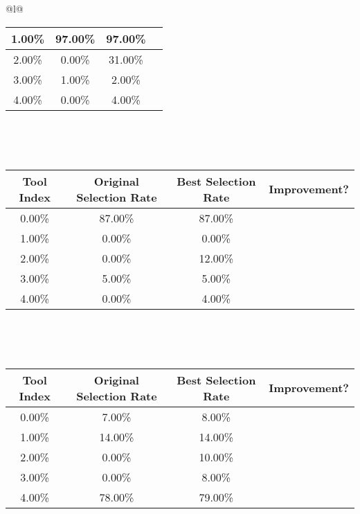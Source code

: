 \begin{longtable}{@{}l@{}}
\begin{minipage}{\textwidth}
\begin{tabular}{|c|c|c|c|}
1.00\% & 97.00\% & 97.00\% & \textcolor{red}{\ding{55}} \\ \hline
2.00\% & 0.00\% & 31.00\% & \textcolor{green}{\ding{51}} \\ \hline
3.00\% & 1.00\% & 2.00\% & \textcolor{green}{\ding{51}} \\ \hline
4.00\% & 0.00\% & 4.00\% & \textcolor{green}{\ding{51}} \\ \hline
\end{tabular}
\end{minipage}\\[2ex]
\begin{minipage}{\textwidth}
\noindent{}\\[0.7ex]
\begin{tabular}{|c|c|c|c|} \hline
\textbf{Tool Index} & \textbf{Original Selection Rate} & \textbf{Best Selection Rate} & \textbf{Improvement?} \\ \hline
0.00\% & 87.00\% & 87.00\% & \textcolor{red}{\ding{55}} \\ \hline
1.00\% & 0.00\% & 0.00\% & \textcolor{red}{\ding{55}} \\ \hline
2.00\% & 0.00\% & 12.00\% & \textcolor{green}{\ding{51}} \\ \hline
3.00\% & 5.00\% & 5.00\% & \textcolor{red}{\ding{55}} \\ \hline
4.00\% & 0.00\% & 4.00\% & \textcolor{green}{\ding{51}} \\ \hline
\end{tabular}
\end{minipage}\\[2ex]
\begin{minipage}{\textwidth}
\noindent{}\\[0.7ex]
\begin{tabular}{|c|c|c|c|} \hline
\textbf{Tool Index} & \textbf{Original Selection Rate} & \textbf{Best Selection Rate} & \textbf{Improvement?} \\ \hline
0.00\% & 7.00\% & 8.00\% & \textcolor{green}{\ding{51}} \\ \hline
1.00\% & 14.00\% & 14.00\% & \textcolor{red}{\ding{55}} \\ \hline
2.00\% & 0.00\% & 10.00\% & \textcolor{green}{\ding{51}} \\ \hline
3.00\% & 0.00\% & 8.00\% & \textcolor{green}{\ding{51}} \\ \hline
4.00\% & 78.00\% & 79.00\% & \textcolor{green}{\ding{51}} \\ \hline

\end{tabular}
\end{minipage}
\end{longtable}
